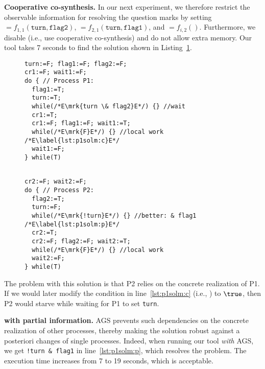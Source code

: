 \textbf{Cooperative co-synthesis.}
In our next experiment, we therefore restrict the observable information for 
resolving the question marks by setting
$=f_{1,1}(\texttt{turn}, \texttt{flag2})$,
$=f_{2,1}(\texttt{turn}, \texttt{flag1})$, and 
$=f_{i,2}()$.  
Furthermore, we disable \ags (i.e., use cooperative co-synthesis) and do not 
allow extra memory. Our tool takes 7 seconds to find the solution shown in 
Listing~\ref{lst:p1solm}.
\begin{figure}[tb]
\label{lst:p1solm}
\vspace{-0.4cm}
\begin{minipage}{0.49\textwidth}
\begin{lstlisting}[firstnumber=0]
                    turn:=F; flag1:=F; flag2:=F;
cr1:=F; wait1:=F;
do { // Process P1:
  flag1:=T;
  turn:=T;
  while(/*E\mrk{turn \& flag2}E*/) {} //wait
  cr1:=T;
  cr1:=F; flag1:=F; wait1:=T;
  while(/*E\mrk{F}E*/) {} //local work /*E\label{lst:p1solm:c}E*/
  wait1:=F;
} while(T)
\end{lstlisting}
\end{minipage}
\hspace{0.1cm}
\begin{minipage}{0.49\textwidth}
\begin{lstlisting}[firstnumber=20]

cr2:=F; wait2:=F;
do { // Process P2:
  flag2:=T;
  turn:=F;
  while(/*E\mrk{!turn}E*/) {} //better: & flag1 /*E\label{lst:p1solm:p}E*/
  cr2:=T;
  cr2:=F; flag2:=F; wait2:=T;
  while(/*E\mrk{F}E*/) {} //local work
  wait2:=F;
} while(T)
\end{lstlisting}
\end{minipage}
\end{figure}
The problem with this solution is that P2 relies on the concrete realization of
P1. If we would later modify the condition in line~\ref{lst:p1solm:c} (i.e.,
) to $\true$, then P2 would starve while waiting for P1 to 
set \texttt{turn}. 

\textbf{\ags with partial information.}
AGS prevents such dependencies on the concrete realization of other processes, 
thereby making the solution robust against a posteriori changes of single 
processes.  Indeed, when running our tool \emph{with} AGS, we get \texttt{!turn 
\& flag1} in line~\ref{lst:p1solm:p}, which resolves the problem.  The execution 
time increases from 7 to 19 seconds, which is acceptable.


